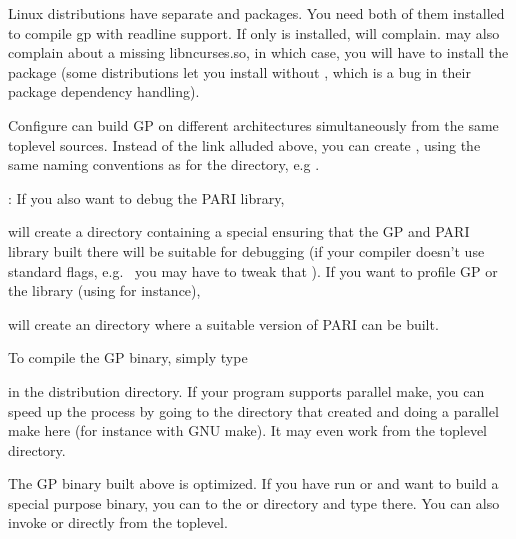  Linux distributions have separate  and
 packages. You need both of them installed to compile gp
with readline support. If only  is installed, 
will complain.  may also complain about a missing
libncurses.so, in which case, you will have to install the
 package (some distributions let you install
 without , which is a bug in their
package dependency handling).

 Configure can build GP on different architectures
simultaneously from the same toplevel sources. Instead of the 
link alluded above, you can create ,
using the same naming conventions as for the  directory,
e.g .

: If you also want to debug the PARI library,


\noindent will create a directory  containing a special
 ensuring that the GP and PARI library built there will be
suitable for debugging (if your compiler doesn't use standard flags,
e.g.~ you may have to tweak that ). If you want to
profile GP or the library (using  for instance), 


\noindent will create an  directory where a suitable version
of PARI can be built.

 To compile the GP binary, simply type


\noindent in the distribution directory. If your  program supports
parallel make, you can speed up the process by going to the 
directory that  created and doing a parallel make here (for
instance  with GNU make). It may even work from the toplevel
directory.

The GP binary built above is optimized. If you have run  or
 and want to build a special purpose binary, you can  to the
 or  directory and type  there. You can also
invoke  or  directly from the toplevel.


